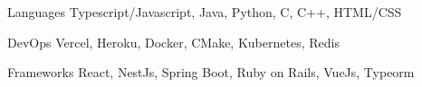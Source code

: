 

\begin{cvskills}

  \cvskill
  {Languages}
  {Typescript/Javascript, Java, Python, C, C++, HTML/CSS}

  \cvskill
  {DevOps}
  {Vercel, Heroku, Docker, CMake, Kubernetes, Redis}

  \cvskill
  {Frameworks}
  {React, NestJs, Spring Boot, Ruby on Rails, VueJs, Typeorm}

\end{cvskills}

